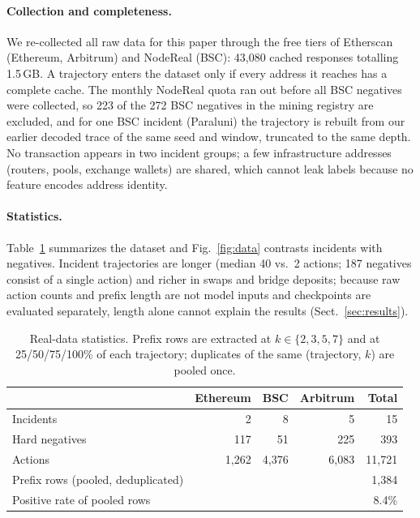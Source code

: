 \paragraph{Collection and completeness.}
We re-collected all raw data for this paper through the free tiers of Etherscan (Ethereum, Arbitrum) and NodeReal (BSC): 43{,}080 cached responses totalling 1.5\,GB.
A trajectory enters the dataset only if every address it reaches has a complete cache.
The monthly NodeReal quota ran out before all BSC negatives were collected, so 223 of the 272 BSC negatives in the mining registry are excluded, and for one BSC incident (Paraluni) the trajectory is rebuilt from our earlier decoded trace of the same seed and window, truncated to the same depth.
No transaction appears in two incident groups; a few infrastructure addresses (routers, pools, exchange wallets) are shared, which cannot leak labels because no feature encodes address identity.

\paragraph{Statistics.}
Table~\ref{tab:data} summarizes the dataset and Fig.~\ref{fig:data} contrasts incidents with negatives.
Incident trajectories are longer (median 40 vs.\ 2 actions; 187 negatives consist of a single action) and richer in swaps and bridge deposits; because raw action counts and prefix length are not model inputs and checkpoints are evaluated separately, length alone cannot explain the results (Sect.~\ref{sec:results}).

\begin{table}[t]
\centering
\caption{Real-data statistics. Prefix rows are extracted at $k\in\{2,3,5,7\}$ and at 25/50/75/100\% of each trajectory; duplicates of the same (trajectory, $k$) are pooled once.}
\label{tab:data}
\small
\begin{tabular}{@{}lrrrr@{}}
\toprule
 & Ethereum & BSC & Arbitrum & Total \\
\midrule
Incidents & 2 & 8 & 5 & 15 \\
Hard negatives & 117 & 51 & 225 & 393 \\
Actions & 1{,}262 & 4{,}376 & 6{,}083 & 11{,}721 \\
Prefix rows (pooled, deduplicated) & & & & 1{,}384 \\
Positive rate of pooled rows & & & & 8.4\% \\
\bottomrule
\end{tabular}
\end{table}

